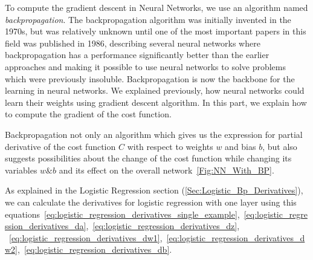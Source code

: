 To compute the gradient descent in Neural Networks, we use an algorithm named \textit{backpropagation}. The backpropagation algorithm was initially invented in the 1970s, but was relatively unknown until one of the most important papers in this field was published in 1986, describing several neural networks where backpropagation has a performance significantly better than the earlier approaches and making it possible to use neural networks to solve problems which were previously insoluble. Backpropagation is now the backbone for the learning in neural networks.
We explained previously, how neural networks could learn their weights using gradient descent algorithm. In this part, we explain how to compute the gradient of the cost function.

Backpropagation not only an algorithm which gives us the expression for partial derivative of the cost function $C$ with respect to weights $w$ and bias $b$, but also suggests possibilities about the change of the cost function while changing its variables $w \& b$ and its effect on the overall network~\ref{Fig:NN_With_BP}.

As explained in the Logistic Regression section (\ref{Sec:Logistic_Bp_Derivatives}), we can calculate the derivatives for logistic regression with one layer using this equations~\eqref{eq:logistic_regression_derivatives_single_example},~\eqref{eq:logistic_regression_derivatives_da},~\eqref{eq:logistic_regression_derivatives_dz},\\
~\eqref{eq:logistic_regression_derivatives_dw1},~\eqref{eq:logistic_regression_derivatives_dw2},~\eqref{eq:logistic_regression_derivatives_db}.\\

